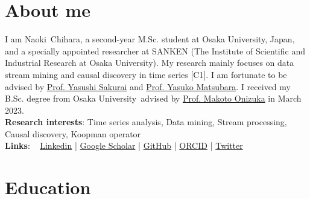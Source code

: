 \documentclass[9pt,a4paper]{article}
\newcommand{\OU}{Osaka University}
\newcommand{\FirstName}{Naoki}
\newcommand{\LastName}{Chihara}
\newcommand{\MyName}{\FirstName\ \LastName}
\newcommand{\ORCID}{0009-0005-7061-8214}
\newcommand{\GitHubProfile}{C-Naoki}
\newcommand{\Linkedin}{c-naoki}
\newcommand{\Gscholar}{pq2b3jQAAAAJ}
\newcommand{\Twitter}{c_naoki13}
\newcommand{\Separator}{\hspace{3pt}|\hspace{3pt}}
\begin{document}
\section{About me}
\vspace{1.0em}
I am \MyName, a second-year M.Sc.\! student at \OU, Japan, and a specially appointed researcher at SANKEN (The Institute of Scientific and Industrial Research at \OU).
My research mainly focuses on data stream mining and causal discovery in time series [C1].
I am fortunate to be advised by \href{https://www.dm.sanken.osaka-u.ac.jp/~yasushi/index-j.html}{Prof. Yasushi Sakurai} and \href{https://www.dm.sanken.osaka-u.ac.jp/~yasuko/}{Prof. Yasuko Matsubara}.
I received my B.Sc.\! degree from \OU\ advised by \href{http://www-bigdata.ist.osaka-u.ac.jp/professor/onizuka/onizuka_en.html}{Prof. Makoto Onizuka} in March 2023.
\vspace{0.2em}
\\
\textbf{Research interests}:
{Time series analysis}, Data mining, Stream processing, {Causal discovery}, Koopman operator
\vspace{0.2em}
\\
\textbf{Links}:
~\faLinkedin{} \href{https://www.linkedin.com/in/\Linkedin}{Linkedin}
\Separator{}
\faGraduationCap{} \href{https://scholar.google.com/citations?hl=en&user=\Gscholar}{Google Scholar}
\Separator{}
\faGithub{} \href{https://github.com/\GitHubProfile}{GitHub}
\Separator{}
\faOrcid{} \href{https://orcid.org/\ORCID}{ORCID}
\Separator{}
\faTwitter{} \href{https://x.com/\Twitter}{Twitter}
\vspace{0.5em}

\section{Education}
\end{document}
